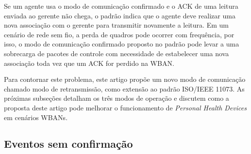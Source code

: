 
Se um agente usa o modo de comunicação confirmado e o ACK de uma leitura enviada ao gerente não chega, o padrão indica que o agente deve realizar uma nova associação com o gerente para transmitir novamente a leitura. Em um cenário de rede sem fio, a perda de quadros pode ocorrer com frequência, por isso, o modo de comunicação confirmado proposto no padrão pode levar a uma sobrecarga de pacotes de controle com necessidade de estabelecer uma nova associação toda vez que um ACK for perdido na WBAN.

Para contornar este problema, este artigo propõe um novo modo de comunicação chamado modo de retransmissão, como extensão ao padrão ISO/IEEE 11073. As próximas subseções detalham os três modos de operação e discutem como a proposta deste artigo pode melhorar o funcionamento de \textit{Personal Health Devices} em cenários WBANs.

\subsection{Eventos sem confirmação}\label{sec:UnconfirmedMeasurementEvent}


